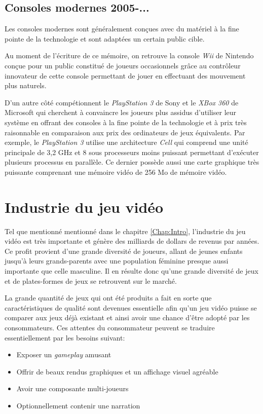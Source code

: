 \documentclass[12pt,oneside,letterpaper,francais]{book}
\begin{document}
\subsection{Consoles modernes 2005-...}
Les consoles modernes sont généralement conçues avec du matériel à la
fine pointe de la technologie et sont adaptées un certain public
cible.

Au moment de l'écriture de ce mémoire, on retrouve la console
\textit{Wii} de Nintendo conçue pour un public constitué de joueurs
occasionnels grâce au contrôleur innovateur de cette console
permettant de jouer en effectuant des mouvement plus naturels.

D'un autre côté compétionnent le \textit{PlayStation 3} de Sony et le
\textit{XBox 360} de Microsoft qui cherchent à convaincre les joueurs
plus assidus d'utiliser leur système en offrant des consoles à la fine
pointe de la technologie et à prix très raisonnable en comparaison aux
prix des ordinateurs de jeux équivalents. Par exemple, le
\textit{PlayStation 3} utilise une architecture \textit{Cell} qui
comprend une unité principale de 3,2 GHz et 8 sous processeurs moins
puissant permettant d'exécuter plusieurs processus en parallèle. Ce
dernier possède aussi une carte graphique très puissante comprenant
une mémoire vidéo de 256 Mo de mémoire vidéo. 



\section{Industrie du jeu vidéo}
Tel que mentionné mentionné dans le chapitre \ref{Chap:Intro},
l'industrie du jeu vidéo est très importante et génère des milliards
de dollars de revenus par années. Ce profit provient d'une grande
diversité de joueurs, allant de jeunes enfants jusqu'à leurs
grands-parents avec une population féminine presque aussi importante
que celle masculine. Il en résulte donc qu'une grande diversité de
jeux et de plates-formes de jeux se retrouvent sur le marché.

La grande quantité de jeux qui ont été produits a fait en sorte que
caractéristiques de qualité sont devenues essentielle afin qu'un jeu
vidéo puisse se comparer aux jeux déjà existant et ainsi avoir une
chance d'être adopté par les consommateurs. Ces attentes du
consommateur peuvent se traduire essentiellement par les besoins
suivant:

\begin{itemize}
\item Exposer un \textit{gameplay} amusant
\item Offrir de beaux rendus graphiques et un affichage visuel
  agréable
\item Avoir une composante multi-joueurs
\item Optionnellement contenir une narration 
\end{itemize}
\end{document}
